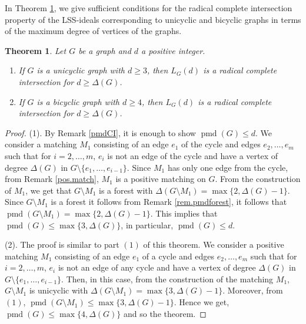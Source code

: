 \documentclass[11pt,a4paper,reqno]{amsart}
\newtheorem{thm}{Theorem}[section]
\theoremstyle{definition}
\numberwithin{equation}{section}
\DeclareMathOperator{\pmd}{pmd}
\begin{document}
In Theorem \ref{Thm:UCI}, we give sufficient conditions for the radical complete intersection property of the LSS-ideals corresponding to unicyclic and bicyclic graphs in terms of the maximum degree of vertices of the graphs. 

\begin{thm} \label{Thm:UCI}
    Let $G$ be a graph and $d$ a positive integer. 
\begin{enumerate}
    \item If $G$ is a unicyclic graph with $d \geq 3$, then $L_{G}(d)$ is a radical complete intersection for $d \geq \Delta(G)$. 
    \item If $G$ is a bicyclic graph with $d \geq 4$, then  $L_{G}(d)$ is a radical complete intersection for $d \geq \Delta(G)$. 
\end{enumerate}
  \end{thm}
\begin{proof}

\noindent (1). By Remark \ref{pmdCI}, it is enough to show $\pmd(G) \leq d$. We consider a matching $M_1$ consisting of an edge $e_1$ of the cycle and edges $e_2, \ldots, e_m$ such that for $i=2, \ldots, m$, $e_i$ is not an edge of the cycle and have a vertex of degree $\Delta(G)$ in $G \setminus \{e_1, \ldots, e_{i-1}\}$. Since $M_1$ has only one edge from the cycle, from Remark \ref{pos.match}, $M_1$ is a positive matching on $G$. From the construction of $M_1$, we get that  $G\setminus M_1$ is a forest with $\Delta(G\setminus M_1) = \max\{2, \Delta(G)-1\}$. Since $G\setminus M_1$ is a forest it follows from Remark \ref{rem.pmdforest}, it follows that $\pmd(G\setminus M_1) = \max\{2, \Delta(G)-1\}$. This implies that $\pmd(G) \leq \max\{3,\Delta(G)\}$, in particular, $\pmd(G) \leq d$. 

\vspace{2mm}

\noindent (2). The proof is similar to part $(1)$ of this theorem. We consider a positive matching $M_1$ consisting of an edge $e_1$ of a cycle and edges $e_2, \ldots, e_m$ such that for $i=2, \ldots, m$, $e_i$ is not an edge of any cycle and have a vertex of degree $\Delta(G)$ in $G \setminus \{e_1, \ldots, e_{i-1}\}$. Then, in this case, from the construction of the matching $M_1$, $G\setminus M_1$ is unicyclic with $\Delta(G\setminus M_1) = \max\{3,\Delta(G)-1\}$. Moreover, from $(1)$,  $\pmd(G\setminus M_1) \leq \max\{3,\Delta(G)-1\}$. Hence we get, $\pmd(G) \leq \max\{4,\Delta(G)\}$ and so the theorem.
\end{proof}
\end{document}
